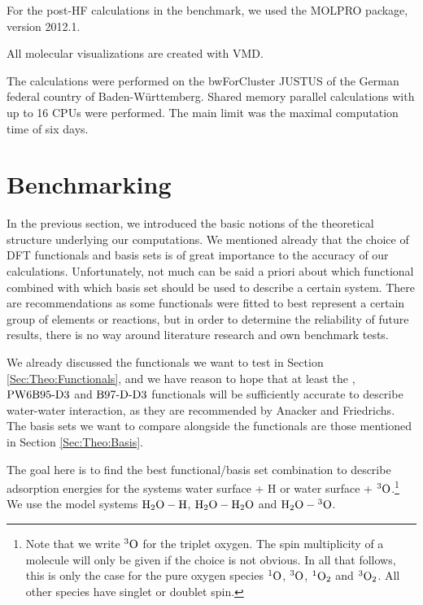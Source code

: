 For the post-HF calculations in the benchmark, we used the MOLPRO
package, version 2012.1.\cite{MOLPRO_brief}

All molecular visualizations are created with VMD.\cite{HUMP96}

The calculations were performed on the bwForCluster JUSTUS of the German
federal country of Baden-Württemberg.\cite{JUSTUS} Shared memory parallel
calculations with up to 16 CPUs were performed. The main limit was the maximal
computation time of six days.



\section{Benchmarking}
\newcommand\htohto{\mbox{\enmat{\hto-\hto}}}
\newcommand\htoo{\mbox{\enmat{\hto-\hspace{.2pt} ^3\te{O}}}}
\newcommand\htoh{\mbox{\enmat{\hto-\te H}}}
\label{Sec:Bench}

In the previous section, we introduced the basic notions of the theoretical
structure underlying our computations. We mentioned already that the choice
of DFT functionals and basis sets is of great importance to the accuracy of our calculations. Unfortunately, not much can be said a priori about
which functional combined with which basis set should be used to describe a certain system.
There are recommendations as some functionals were fitted to best represent a certain
group of elements or reactions, but in order to determine the reliability of
future results, there is no way around literature research and own benchmark
tests.

We already
discussed the functionals we want to test in Section \ref{Sec:Theo:Functionals}, and we
have reason to hope that at least the \pbez, $\text{PW6B95}\text{-D3}$ and $\text{B97-D}\text{-D3}$ functionals will be sufficiently
accurate to describe water-water interaction, as they are recommended by Anacker
and Friedrichs. \cite{Anacker2014} The basis sets we want to compare alongside
the functionals are those mentioned in Section \ref{Sec:Theo:Basis}.

The goal here is to find the best functional/basis set combination to describe
adsorption energies for the systems water surface + H or water surface +
${^3\text{O}}$.\footnote{Note that we write ${^3\text{O}}$ for the triplet oxygen. The spin
multiplicity of a molecule will only be given if the choice is not obvious. In all that
follows, this is only the case for the pure oxygen species ${^1\text{O}}$, ${^3\text{O}}$,
${^1\text O_2}$ and ${^3\text O_2}$. All other species have singlet or doublet spin.}
We use the model systems $\htoh$, $\htohto$ and $\htoo$.

